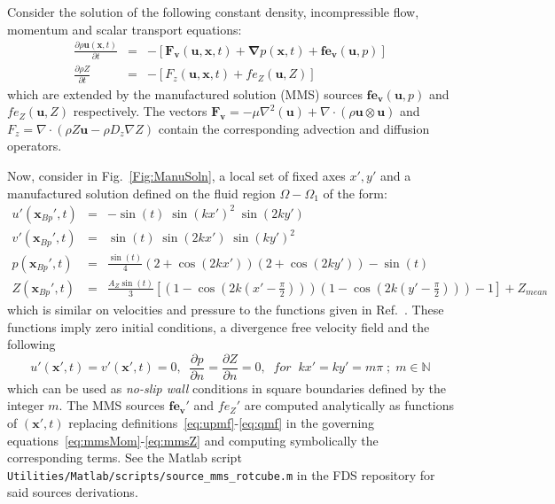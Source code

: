 \documentclass[11pt]{book}
\begin{document}
Consider the solution of the following constant density, incompressible flow, momentum and scalar transport equations:
%
\begin{eqnarray}
  \frac{\partial \rho \mathbf{u}(\mathbf{x},t)}{\partial t} &=& -\left[ \mathbf{F_v}(\mathbf{u},\mathbf{x},t) + \boldsymbol{\nabla} p(\mathbf{x},t) + \mathbf{fe_v}(\mathbf{u},p) \right] \label{eq:mmsMom} \\
  \frac{\partial \rho Z}{\partial t} &=& -\left[  F_z(\mathbf{u},\mathbf{x},t) +  fe_Z(\mathbf{u},Z)   \right]
  \label{eq:mmsZ}
\end{eqnarray}
%
which are extended by the manufactured solution (MMS) sources $\mathbf{fe_v}(\mathbf{u},p)$ and $fe_Z(\mathbf{u},Z)$ respectively. The vectors $\mathbf{F_v}=-\mu \nabla^2(\mathbf{u}) + \nabla \cdot \left( \rho \mathbf{u} \otimes \mathbf{u} \right)$ and $F_z= \nabla \cdot \left( \rho Z \mathbf{u} - \rho D_z \nabla Z \right) $ contain the corresponding advection and diffusion operators.

Now, consider in Fig.~\ref{Fig:ManuSoln}, a local set of fixed axes $x',y'$ and a manufactured solution defined on the fluid region $\Omega - \Omega_1$ of the form:
%
\begin{eqnarray}
   u'(\mathbf{x}_{Bp}',t) &=& -\sin(t) \; \sin(kx')^2 \; \sin(2ky') \label{eq:upmf} \\
   v'(\mathbf{x}_{Bp}',t) &=&   \sin(t) \; \sin(2kx') \; \sin(ky')^2 \label{eq:vpmf} \\
   p(\mathbf{x}_{Bp}',t) &=& \frac{\sin(t)}{4} \left( 2+\cos(2kx') \right) \left( 2+\cos(2ky') \right) - \sin(t) \label{eq:pmf} \\
   Z(\mathbf{x}_{Bp}',t) &=& \frac{A_Z \sin(t)}{3} \left[ \left( 1-\cos(2k(x'-\frac{\pi}{2})) \right)
                                                                                   \left( 1-\cos(2k(y'-\frac{\pi}{2})) \right) - 1 \right] + Z_{mean} \label{eq:qmf}
\end{eqnarray}
%
which is similar on velocities and pressure to the functions given in Ref.~\cite{E:CMS2003}.  These functions imply zero initial conditions, a divergence free velocity field and the following
%
\begin{equation}
   u'(\mathbf{x}',t)=v'(\mathbf{x}',t)=0, \; \; \frac{\partial p}{\partial n} = \frac{\partial Z}{\partial n}=0, \; \;
   for \; \; kx'=ky'= m \pi \; ; \; m \in \mathbb{N}
\end{equation}
%
which can be used as \textit{no-slip wall} conditions in square boundaries defined by the integer $m$.
The MMS sources $\mathbf{fe_v'}$ and $fe_Z'$ are computed analytically as functions of $(\mathbf{x'},t)$ replacing definitions~\eqref{eq:upmf}-\eqref{eq:qmf} in the governing equations~\eqref{eq:mmsMom}-\eqref{eq:mmsZ} and computing symbolically the corresponding terms. See the Matlab script \texttt{Utilities/Matlab/scripts/source\_mms\_rotcube.m} in the FDS repository for said sources derivations.
\end{document}
